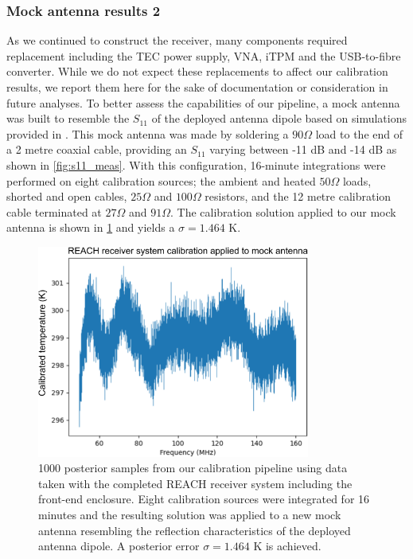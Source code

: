 \subsubsection{Mock antenna results 2}
As we continued to construct the receiver, many components required replacement including the TEC power supply, VNA, iTPM and the USB-to-fibre converter. While we do not expect these replacements to affect our calibration results, we report them here for the sake of documentation or consideration in future analyses. To better assess the capabilities of our pipeline, a mock antenna was built to resemble the $S_{11}$ of the deployed antenna dipole based on simulations provided in \citet{john_antenna}. This mock antenna was made by soldering a $90 \Omega$ load to the end of a 2 metre coaxial cable, providing an $S_{11}$ varying between -11 dB and -14 dB as shown in \cref{fig:s11_meas}. With this configuration, 16-minute integrations were performed on eight calibration sources; the ambient and heated $50 \Omega$ loads, shorted and open cables, $25 \Omega$ and $100 \Omega$ resistors, and the 12 metre calibration cable terminated at $27 \Omega$ and $91 \Omega$. The calibration solution applied to our mock antenna is shown in \cref{fig:reach_results_2} and yields a $\sigma = 1.464$ K.
\begin{figure}
    \centering
    \includegraphics[width=0.8\textwidth]{reach_results_2}
    \caption{1000 posterior samples from our calibration pipeline using data taken with the completed REACH receiver system including the front-end enclosure. Eight calibration sources were integrated for 16 minutes and the resulting solution was applied to a new mock antenna resembling the reflection characteristics of the deployed antenna dipole. A posterior error $\sigma = 1.464$ K is achieved.}
    \label{fig:reach_results_2}
\end{figure}
